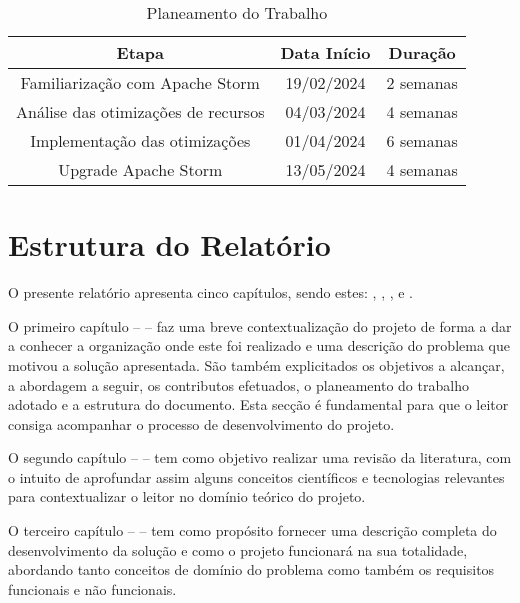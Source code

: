 \begin{table}[H]
  \begin{center}
    \caption{Planeamento do Trabalho}
    \vspace{5mm}
    \label{tab:plan}
    \begin{tabular}{|c|c|c|}
      \hline
      \textbf{Etapa} & \textbf{Data Início} & \textbf{Duração} \\ \hline
      Familiarização com Apache Storm  & 19/02/2024 & 2 semanas \\ \hline
      Análise das otimizações de recursos & 04/03/2024 & 4 semanas \\ \hline
      Implementação das otimizações & 01/04/2024 & 6 semanas \\ \hline
      Upgrade Apache Storm & 13/05/2024 & 4 semanas \\ \hline
    \end{tabular}
  \end{center}
\end{table}

\section{Estrutura do Relatório}

O presente relatório apresenta cinco capítulos, sendo estes: ,
, ,  e
.

O primeiro capítulo –  – faz uma breve contextualização do projeto de
forma a dar a conhecer a organização onde este foi realizado e uma descrição do problema que motivou
a solução apresentada. São também explicitados os objetivos a alcançar, a abordagem a seguir, os
contributos efetuados, o planeamento do trabalho adotado e a estrutura do documento. Esta secção é 
fundamental para que o leitor consiga acompanhar o processo de desenvolvimento do projeto.

O segundo capítulo –  – tem como objetivo realizar uma revisão da
literatura, com o intuito de aprofundar assim alguns conceitos científicos e tecnologias relevantes 
para contextualizar o leitor no domínio teórico do projeto.  

O terceiro capítulo –  – tem como propósito fornecer uma descrição completa 
do desenvolvimento da solução e como o projeto funcionará na sua totalidade, abordando tanto conceitos
de domínio do problema como também os requisitos funcionais e não funcionais.

